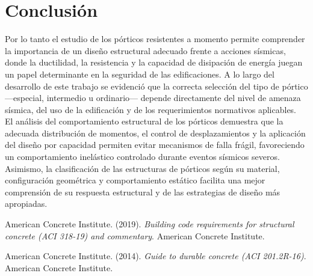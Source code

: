 \documentclass[14pt,letterpaper]{extarticle}
\begin{document}
	
	
	
	
	
	
	
		\newpage
	

	\section{Conclusión}
	Por lo tanto el estudio de los pórticos resistentes a momento permite comprender la importancia de un diseño estructural adecuado frente a acciones sísmicas, donde la ductilidad, la resistencia y la capacidad de disipación de energía juegan un papel determinante en la seguridad de las edificaciones. A lo largo del desarrollo de este trabajo se evidenció que la correcta selección del tipo de pórtico —especial, intermedio u ordinario— depende directamente del nivel de amenaza sísmica, del uso de la edificación y de los requerimientos normativos aplicables. \\
	
	El análisis del comportamiento estructural de los pórticos demuestra que la adecuada distribución de momentos, el control de desplazamientos y la aplicación del diseño por capacidad permiten evitar mecanismos de falla frágil, favoreciendo un comportamiento inelástico controlado durante eventos sísmicos severos. Asimismo, la clasificación de las estructuras de pórticos según su material, configuración geométrica y comportamiento estático facilita una mejor comprensión de su respuesta estructural y de las estrategias de diseño más apropiadas.
	
	\newpage

	
	
\renewcommand{\refname}{Referencias}




\renewcommand{\refname}{Referencias}

American Concrete Institute. (2019). \textit{Building code requirements for structural concrete (ACI 318-19) and commentary}. American Concrete Institute.


American Concrete Institute. (2014). \textit{Guide to durable concrete (ACI 201.2R-16)}. American Concrete Institute.
\end{document}
